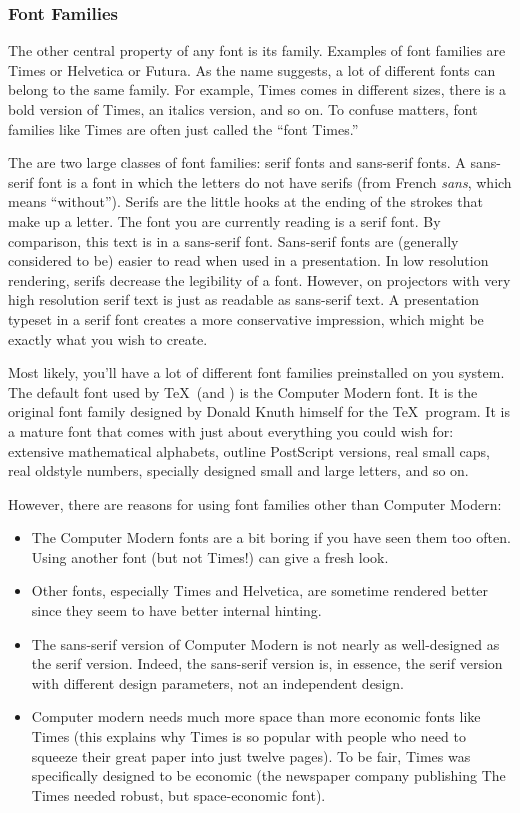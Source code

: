 \subsubsection{Font Families}

\label{section-guidelines-serif}

The other central property of any font is its family. Examples of font
families are Times or Helvetica or Futura. As the name suggests, a lot
of different fonts can belong to the same family. For example, Times
comes in different sizes, there is a bold version of Times, an
italics version, and so on. To confuse matters, font families like
Times are often just called the ``font Times.''

The are two large classes of font families: serif fonts and
sans-serif fonts. A sans-serif font is a font in
which the letters do not have serifs (from French \emph{sans}, which
means ``without''). Serifs are the little hooks at the ending of the
strokes that make up a letter. The font you are currently reading is a
serif font. \textsf{By comparison, this text is in a sans-serif font.}
Sans-serif fonts are (generally considered to be) easier to read
when used in a presentation. In low resolution rendering, serifs
decrease the legibility of a font. However, on projectors with very
high resolution serif text is just as readable as sans-serif text. A
presentation typeset in a serif font creates a more conservative
impression, which might be exactly what you wish to create. 

Most likely, you'll have a lot of different font families preinstalled
on you system. The default font used by \TeX\ (and \beamer) is the
Computer Modern font. It  is the original font family designed by Donald
Knuth himself for the \TeX\ program. It is a mature font that comes
with just about everything you could wish for: extensive mathematical
alphabets, outline PostScript versions, real small caps, real oldstyle
numbers, specially designed small and large letters, and so on.

However, there are reasons for using font families other than Computer
Modern: 
\begin{itemize}
\item
  The Computer Modern fonts are a bit boring if you have seen them too
  often. Using another font (but not Times!) can give a fresh look.
\item
  Other fonts, especially Times and Helvetica, are sometime rendered
  better since they seem to have better internal hinting.
\item
  The sans-serif version of Computer Modern is not nearly as
  well-designed as the serif version. Indeed, the sans-serif version
  is, in essence, the serif version with different design parameters,
  not an independent design.
\item
  Computer modern needs much more space than more economic fonts like
  Times (this explains why Times is so popular with people who need
  to squeeze their great paper into just twelve pages). To be fair,
  Times was specifically designed to be economic (the newspaper
  company publishing The Times needed robust, but space-economic font).
\end{itemize}

